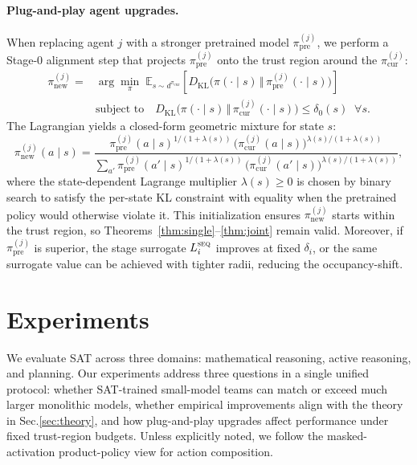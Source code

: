 \documentclass[sigconf]{aamas}
\newcommand{\E}{\mathbb{E}}
\newcommand{\KL}{D_{\mathrm{KL}}}
\begin{document}
\paragraph{Plug-and-play agent upgrades.}
When replacing agent $j$ with a stronger pretrained model $\pi_{\text{pre}}^{(j)}$, we perform a Stage-0 alignment step that projects $\pi_{\text{pre}}^{(j)}$ onto the trust region around the $\pi_{\mathrm{cur}}^{(j)}$:
\begin{equation}
\begin{aligned}
\pi_{\text{new}}^{(j)}
={}&\arg\min_{\pi}\;\E_{s\sim d^{\pi_{\mathrm{cur}}}}\!\left[\KL\big(\pi(\cdot\mid s)\,\Vert\,\pi_{\text{pre}}^{(j)}(\cdot\mid s)\big)\right] \\
&\text{subject to}\quad
\KL\!\big(\pi(\cdot\mid s)\,\Vert\,\pi_{\mathrm{cur}}^{(j)}(\cdot\mid s)\big)\le \delta_0(s)\;\;\forall s.
\end{aligned}
\end{equation}
The Lagrangian yields a closed-form geometric mixture for state $s$:
\begin{equation}
\pi_{\text{new}}^{(j)}(a\mid s) = \frac{\pi_{\text{pre}}^{(j)}(a\mid s)^{1/(1+\lambda(s))}\,\big(\pi_{\mathrm{cur}}^{(j)}(a\mid s)\big)^{\lambda(s)/(1+\lambda(s))}}{\sum_{a'}\pi_{\text{pre}}^{(j)}(a'\mid s)^{1/(1+\lambda(s))}\,\big(\pi_{\mathrm{cur}}^{(j)}(a'\mid s)\big)^{\lambda(s)/(1+\lambda(s))}},
\end{equation}
where the state-dependent Lagrange multiplier $\lambda(s)\ge 0$ is chosen by binary search to satisfy the per-state KL constraint with equality when the pretrained policy would otherwise violate it. This initialization ensures $\pi_{\text{new}}^{(j)}$ starts within the trust region, so Theorems~\ref{thm:single}--\ref{thm:joint} remain valid. Moreover, if $\pi_{\text{pre}}^{(j)}$ is superior, the stage surrogate $L_i^{\textsc{seq}}$ improves at fixed $\delta_i$, or the same surrogate value can be achieved with tighter radii, reducing the occupancy-shift. 
\section{Experiments}
\label{sec:experiment}

We evaluate SAT across three domains: mathematical reasoning, active reasoning, and planning. Our experiments address three questions in a single unified protocol: whether SAT-trained small-model teams can match or exceed much larger monolithic models, whether empirical improvements align with the theory in Sec.\ref{sec:theory}, and how plug-and-play upgrades affect performance under fixed trust-region budgets. Unless explicitly noted, we follow the masked-activation product-policy view for action composition.
\end{document}

